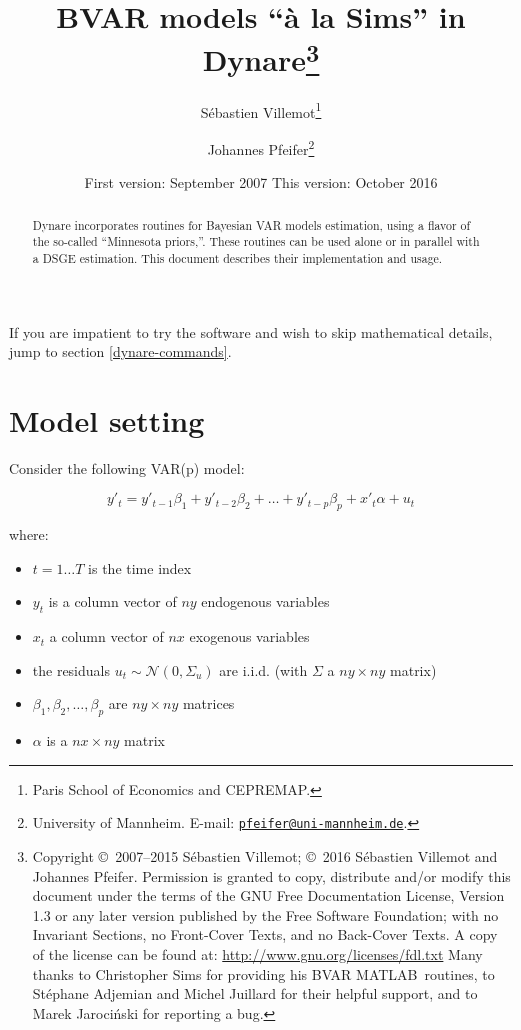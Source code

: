 \documentclass[11pt,a4paper]{article}
\begin{document}
\title{BVAR models ``\`a la Sims'' in Dynare\thanks{Copyright \copyright~2007--2015 S\'ebastien
    Villemot; \copyright~2016 S\'ebastien
    Villemot and Johannes Pfeifer. Permission is granted to copy, distribute and/or modify
    this document under the terms of the GNU Free Documentation
    License, Version 1.3 or any later version published by the Free
    Software Foundation; with no Invariant Sections, no Front-Cover
    Texts, and no Back-Cover Texts. A copy of the license can be found
    at: \url{http://www.gnu.org/licenses/fdl.txt}
    \newline
    \indent Many thanks to Christopher Sims for providing his BVAR
    MATLAB\textregistered~routines, to St\'ephane Adjemian and Michel Juillard
    for their helpful support, and to Marek Jaroci\'nski for reporting a bug.
  }}

\author{S\'ebastien Villemot\thanks{Paris School of Economics and
    CEPREMAP.} \and Johannes Pfeifer\thanks{University of Mannheim. E-mail: \href{mailto:pfeifer@uni-mannheim.de}{\texttt{pfeifer@uni-mannheim.de}}.}}
\date{First version: September 2007 \hspace{1cm} This version: October 2016}

\maketitle

\begin{abstract}
  Dynare incorporates routines for Bayesian VAR models estimation, using a
  flavor of the so-called ``Minnesota priors,''. These routines can be used
  alone or in parallel with a DSGE estimation. This document describes their
  implementation and usage.
\end{abstract}

If you are impatient to try the software and wish to skip mathematical details, jump to section \ref{dynare-commands}.

\section{Model setting}

Consider the following VAR(p) model:

$$y'_t = y'_{t-1}\beta_1 + y'_{t-2}\beta_2 + \ldots + y'_{t-p}\beta_p + x'_t\alpha + u_t$$

where:
\begin{itemize}
\item $t = 1\ldots T$ is the time index
\item $y_t$ is a column vector of $ny$ endogenous variables
\item $x_t$ a column vector of $nx$ exogenous variables
\item the residuals $u_t \sim \mathcal{N}(0, \Sigma_u)$ are i.i.d. (with $\Sigma$ a $ny\times ny$ matrix)
\item $\beta_1,\beta_2,\ldots,\beta_p$ are $ny\times ny$ matrices
\item $\alpha$ is a $nx\times ny$ matrix
\end{itemize}
\end{document}
